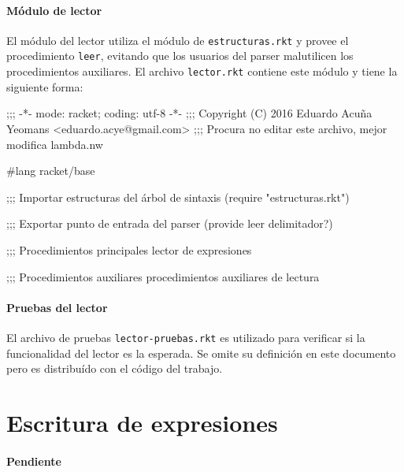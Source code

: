 \documentclass[letterpaper,twoside,openright,10pt]{book}
\begin{document}
\nwenddocs{}\paragraph{Módulo de lector} El módulo del lector utiliza el módulo de {\tt{}estructuras.rkt} y provee el procedimiento {\tt{}\protect{}leer}, evitando que los usuarios del parser malutilicen los procedimientos auxiliares. El archivo {\tt{}lector.rkt} contiene este módulo y tiene la siguiente forma:

\nwenddocs{}\endmoddef
;;; -*- mode: racket; coding: utf-8 -*-
;;; Copyright (C) 2016 Eduardo Acuña Yeomans <eduardo.acye@gmail.com>
;;; Procura no editar este archivo, mejor modifica lambda.nw

#lang racket/base

;;; Importar estructuras del árbol de sintaxis
(require "estructuras.rkt")

;;; Exportar punto de entrada del parser
(provide leer
         delimitador?)

;;; Procedimientos principales
\LA{}lector de expresiones~{\nwtagstyle{}}\RA{}

;;; Procedimientos auxiliares
\LA{}procedimientos auxiliares de lectura~{\nwtagstyle{}}\RA{}
\nwendcode{}\nwdocspar

\nwenddocs{}\paragraph{Pruebas del lector} El archivo de pruebas {\tt{}lector-pruebas.rkt} es utilizado para verificar si la funcionalidad del lector es la esperada. Se omite su definición en este documento pero es distribuído con el código del trabajo.

\nwenddocs{}\section*{Escritura de expresiones}

\paragraph{Pendiente}
\end{document}
